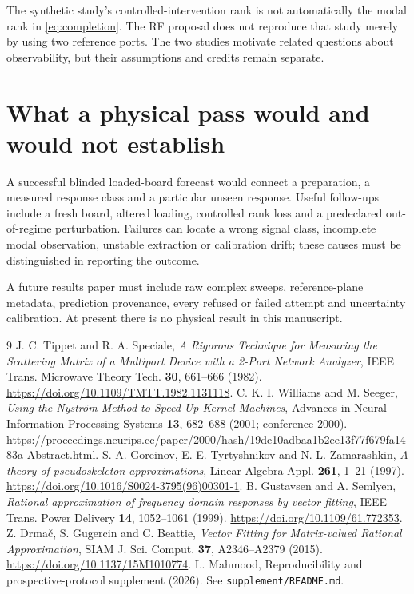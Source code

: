 \documentclass[11pt]{article}
\begin{document}
The synthetic study's controlled-intervention rank is not automatically the modal rank in
\eqref{eq:completion}. The RF proposal does not reproduce that study merely by
using two reference ports. The two studies motivate related questions
about observability, but their assumptions and credits remain separate.

\section{What a physical pass would and would not establish}
A successful blinded loaded-board forecast would connect a preparation,
a measured response class and a particular unseen response. Useful follow-ups
include a fresh board, altered loading, controlled rank loss and a
predeclared out-of-regime perturbation. Failures can locate a wrong signal
class, incomplete modal observation, unstable extraction or calibration drift;
these causes must be distinguished in reporting the outcome.

A future results paper must include raw complex sweeps, reference-plane
metadata, prediction provenance, every refused or failed attempt and uncertainty
calibration. At present there is no physical result in this manuscript.

\aistatement
\begin{thebibliography}{9}
 J. C. Tippet and R. A. Speciale,
\emph{A Rigorous Technique for Measuring the Scattering Matrix of a
Multiport Device with a 2-Port Network Analyzer},
IEEE Trans. Microwave Theory Tech. \textbf{30}, 661--666 (1982).
\url{https://doi.org/10.1109/TMTT.1982.1131118}.
 C. K. I. Williams and M. Seeger,
\emph{Using the Nystr\"om Method to Speed Up Kernel Machines},
Advances in Neural Information Processing Systems \textbf{13},
682--688 (2001; conference 2000).
\url{https://proceedings.neurips.cc/paper/2000/hash/19de10adbaa1b2ee13f77f679fa1483a-Abstract.html}.
 S. A. Goreinov, E. E. Tyrtyshnikov and N. L. Zamarashkin,
\emph{A theory of pseudoskeleton approximations},
Linear Algebra Appl. \textbf{261}, 1--21 (1997).
\url{https://doi.org/10.1016/S0024-3795(96)00301-1}.
 B. Gustavsen and A. Semlyen,
\emph{Rational approximation of frequency domain responses by vector fitting},
IEEE Trans. Power Delivery \textbf{14}, 1052--1061 (1999).
\url{https://doi.org/10.1109/61.772353}.
 Z. Drma\v{c}, S. Gugercin and C. Beattie,
\emph{Vector Fitting for Matrix-valued Rational Approximation},
SIAM J. Sci. Comput. \textbf{37}, A2346--A2379 (2015).
\url{https://doi.org/10.1137/15M1010774}.
 L. Mahmood, Reproducibility and prospective-protocol
supplement (2026). See \texttt{supplement/README.md}.
\end{thebibliography}
\end{document}
